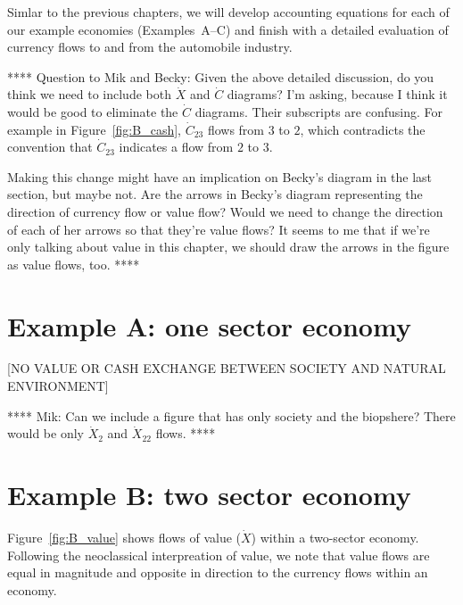 Simlar to the previous chapters, we will develop accounting equations
for each of our example economies (Examples~A--C) and finish 
with a detailed evaluation of currency flows 
to and from the automobile industry.

**** Question to Mik and Becky: Given the above detailed discussion, 
do you think we need to include both $\dot{X}$ and $\dot{C}$ diagrams?
I'm asking, because I think it would be good to eliminate the $\dot{C}$
diagrams. Their subscripts are confusing. For example in 
Figure~\ref{fig:B_cash}, $\dot{C}_{23}$ flows from $3$ to $2$, 
which contradicts the convention that $\dot{C}_{23}$ indicates a flow
from $2$ to $3$. 

Making this change might have an implication
on Becky's diagram in the last section, but maybe not.
Are the arrows in Becky's diagram representing the direction 
of currency flow or value flow? Would we need to change the direction
of each of her arrows so that they're value flows? It seems to me that 
if we're only talking about value in this chapter, we should
draw the arrows in the figure as value flows, too.
****


\section{Example A: one sector economy}

[NO VALUE OR CASH EXCHANGE BETWEEN SOCIETY AND NATURAL ENVIRONMENT]

**** Mik: Can we include a figure that has only society and the biopshere? 
There would be only $\dot{X}_{2}$ and $\dot{X}_{22}$ flows. ****


\section{Example B: two sector economy}

Figure~\ref{fig:B_value} shows flows of value ($\dot{X}$) 
within a two-sector economy. 
Following the neoclassical interpreation of value, we note that
value flows are equal in magnitude and opposite in direction 
to the currency flows within an economy. 

